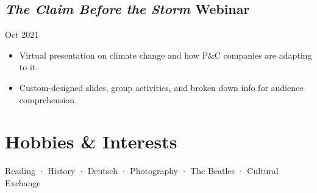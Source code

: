 \documentclass[12pt]{article}
\newcommand{\itemspace}{\vspace{0.1870em}}
\begin{document}
\subsection{\textit{The Claim Before the Storm} Webinar} \hfill Oct 2021

\begin{itemize}[noitemsep,nolistsep]
  \item Virtual presentation on climate change and how P\&C companies are
    adapting to it.


  \item Custom-designed slides, group activities, and broken down info for
    audience comprehension.
\end{itemize}

\itemspace

\section{Hobbies \& Interests}

Reading · History · Deutsch · Photography · The Beatles · Cultural Exchange
\end{document}

